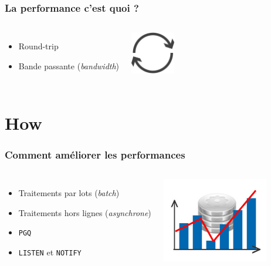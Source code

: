 \documentclass{beamer}
\begin{document}
\begin{frame}
  \frametitle{La performance c'est quoi ?}

  \vfill

\begin{columns}[c]

  \begin{itemize}
  \item Round-trip
  \item Bande passante (\textit{bandwidth})
  \end{itemize}

\begin{center}
  \includegraphics[height=5em]{roundtrip.png}
\end{center}
\end{columns}
\end{frame}

\section{How}

\begin{frame}
  \frametitle{Comment améliorer les performances}

  \vfill

\begin{columns}[c]

\begin{itemize}
  \item Traitements par lots (\textit{batch})
  \item Traitements hors lignes (\textit{asynchrone})
  \item \texttt{PGQ}
  \item \texttt{LISTEN} et \texttt{NOTIFY}
\end{itemize}

\begin{center}
  \includegraphics[height=10em]{optimisation.jpg}
\end{center}
\end{columns}
\end{frame}
\end{document}

